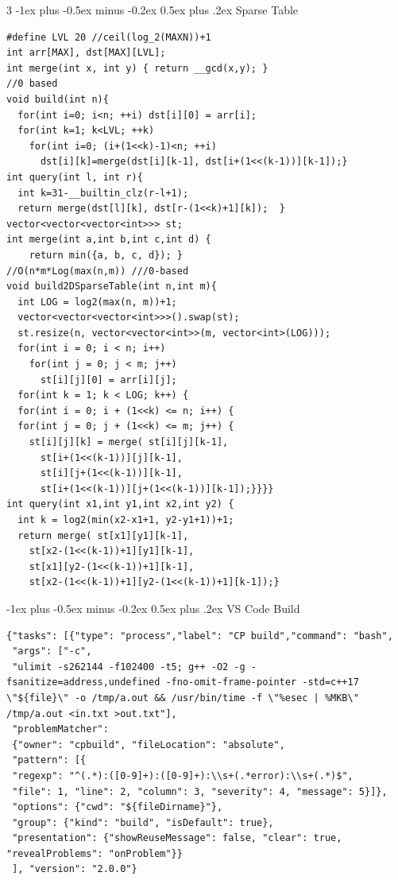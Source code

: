 \documentclass[8pt,a4paper,onesided]{article}
\makeatletter
\renewcommand{\subsection}{\@startsection{subsection}{2}{0mm}
    {-1ex plus -0.5ex minus -0.2ex} %
    {0.5ex plus .2ex}                %
    {\normalfont\large\bfseries}}    %
\makeatother
\begin{document}
\begin{multicols}{3}
\subsection{Sparse Table}
\begin{verbatim}
#define LVL 20 //ceil(log_2(MAXN))+1
int arr[MAX], dst[MAX][LVL];
int merge(int x, int y) { return __gcd(x,y); }
//0 based
void build(int n){
  for(int i=0; i<n; ++i) dst[i][0] = arr[i];
  for(int k=1; k<LVL; ++k)
    for(int i=0; (i+(1<<k)-1)<n; ++i)
      dst[i][k]=merge(dst[i][k-1], dst[i+(1<<(k-1))][k-1]);}
int query(int l, int r){
  int k=31-__builtin_clz(r-l+1);
  return merge(dst[l][k], dst[r-(1<<k)+1][k]);  }
vector<vector<vector<int>>> st;
int merge(int a,int b,int c,int d) {
    return min({a, b, c, d}); }
//O(n*m*Log(max(n,m)) ///0-based
void build2DSparseTable(int n,int m){
  int LOG = log2(max(n, m))+1;
  vector<vector<vector<int>>>().swap(st);
  st.resize(n, vector<vector<int>>(m, vector<int>(LOG)));
  for(int i = 0; i < n; i++)
    for(int j = 0; j < m; j++)
      st[i][j][0] = arr[i][j];
  for(int k = 1; k < LOG; k++) {
  for(int i = 0; i + (1<<k) <= n; i++) {
  for(int j = 0; j + (1<<k) <= m; j++) {
    st[i][j][k] = merge( st[i][j][k-1],
      st[i+(1<<(k-1))][j][k-1],
      st[i][j+(1<<(k-1))][k-1],
      st[i+(1<<(k-1))][j+(1<<(k-1))][k-1]);}}}}
int query(int x1,int y1,int x2,int y2) {
  int k = log2(min(x2-x1+1, y2-y1+1))+1;
  return merge( st[x1][y1][k-1],
    st[x2-(1<<(k-1))+1][y1][k-1],
    st[x1][y2-(1<<(k-1))+1][k-1],
    st[x2-(1<<(k-1))+1][y2-(1<<(k-1))+1][k-1]);}
\end{verbatim}
\subsection{VS Code Build}
\begin{verbatim}
{"tasks": [{"type": "process","label": "CP build","command": "bash",
 "args": ["-c",
 "ulimit -s262144 -f102400 -t5; g++ -O2 -g -fsanitize=address,undefined -fno-omit-frame-pointer -std=c++17 \"${file}\" -o /tmp/a.out && /usr/bin/time -f \"%esec | %MKB\" /tmp/a.out <in.txt >out.txt"],
 "problemMatcher":
 {"owner": "cpbuild", "fileLocation": "absolute",
 "pattern": [{
 "regexp": "^(.*):([0-9]+):([0-9]+):\\s+(.*error):\\s+(.*)$",
 "file": 1, "line": 2, "column": 3, "severity": 4, "message": 5}]},
 "options": {"cwd": "${fileDirname}"},
 "group": {"kind": "build", "isDefault": true},
 "presentation": {"showReuseMessage": false, "clear": true, "revealProblems": "onProblem"}}
 ], "version": "2.0.0"}
\end{verbatim}

\end{multicols}
\end{document}
